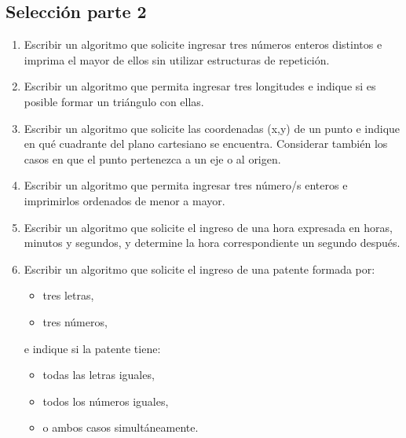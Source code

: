 \begin{ejercicioClase}
  \subsection*{Selección parte 2}
  \begin{enumerate}
    \item Escribir un algoritmo que solicite ingresar tres números enteros distintos e imprima el mayor de ellos sin utilizar estructuras de repetición.
    \item Escribir un algoritmo que permita ingresar tres longitudes e indique si es posible formar un triángulo con ellas.
    \item Escribir un algoritmo que solicite las coordenadas (x,y) de un punto e indique en qué cuadrante del plano cartesiano se encuentra. Considerar también los casos en que el punto pertenezca a un eje o al origen.
    \item Escribir un algoritmo que permita ingresar tres número/s enteros e imprimirlos ordenados de menor a mayor.
    \item Escribir un algoritmo que solicite el ingreso de una hora expresada en horas, minutos y segundos, y determine la hora correspondiente un segundo después.
    \item Escribir un algoritmo que solicite el ingreso de una patente formada por:

    \begin{itemize}
      \item tres letras,
      \item tres números,
    \end{itemize}
    e indique si la patente tiene:
    \begin{itemize}
      \item todas las letras iguales,
      \item todos los números iguales,
      \item o ambos casos simultáneamente.
    \end{itemize}
  \end{enumerate}
\end{ejercicioClase}

